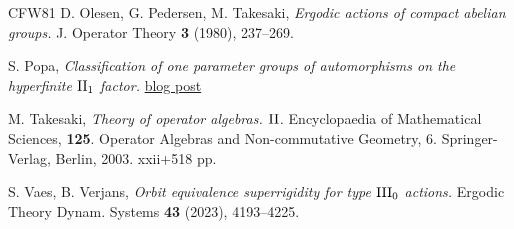 \documentclass[a4paper,11pt]{amsart}
\numberwithin{equation}{section}
\theoremstyle{definition}
\newcommand{\II}{{\rm II}}
\newcommand{\III}{{\rm III}}
\begin{document}
\begin{thebibliography}{CFW81}
 {\sc D. Olesen, G. Pedersen, M. Takesaki}, {\it Ergodic actions of compact abelian groups.} J. Operator Theory {\bf 3} (1980), 237--269.

 {\sc S. Popa}, {\it Classification of one parameter groups of automorphisms on the hyperfinite $\II_1$ factor.} \href{https://sorintpopa.wordpress.com/2025/10/14/q7-classification-of-one-parameter-groups-of-automorphisms-on-the-hyperfinite-iilatex-_1-factor/}{blog post}

 {\sc M. Takesaki}, {\it Theory of operator algebras. $\II$.} Encyclopaedia of Mathematical Sciences, {\bf 125}. Operator Algebras and Non-commutative Geometry, 6. Springer-Verlag, Berlin, 2003. xxii+518 pp.

 {\sc S. Vaes, B. Verjans}, {\it Orbit equivalence superrigidity for type $\III_0$ actions.} Ergodic Theory Dynam. Systems {\bf 43} (2023), 4193--4225.

\end{thebibliography}


\end{document}

